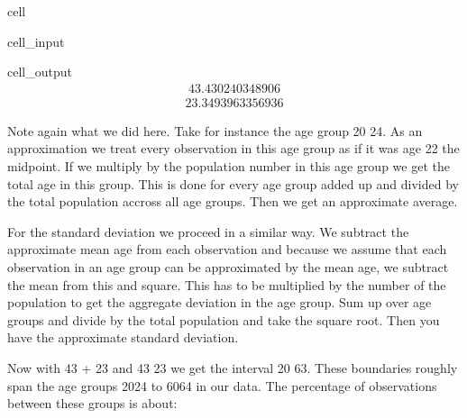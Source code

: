 \documentclass[letterpaper,10pt,english]{jupyterBook}
\begin{document}
\begin{sphinxuseclass}{cell}
\begin{sphinxVerbatimInput}
\begin{sphinxuseclass}{cell_input}
\begin{sphinxVerbatim}[commandchars=\\\{\}]
\end{sphinxVerbatim}

\end{sphinxuseclass}\end{sphinxVerbatimInput}
\begin{sphinxVerbatimOutput}

\begin{sphinxuseclass}{cell_output}\begin{equation*}
\begin{split}43.430240348906\end{split}
\end{equation*}\begin{equation*}
\begin{split}23.3493963356936\end{split}
\end{equation*}
\end{sphinxuseclass}\end{sphinxVerbatimOutput}

\end{sphinxuseclass}
\sphinxAtStartPar
Note again what we did here. Take for instance the age group 20 \sphinxhyphen{} 24. As an approximation we treat every observation in this age group as if it was age 22 \sphinxhyphen{} the midpoint. If we multiply by the population number in this age group we get the total age in this group. This is done for every age group added up and divided by the
total population accross all age groups. Then we get an approximate average.

\sphinxAtStartPar
For the standard deviation we proceed in a similar way. We subtract the approximate mean age from each observation and because we assume that each observation in an age group can be approximated by the mean age, we subtract the mean from this and square. This has to be multiplied by the number of the population to get the aggregate deviation in the age group. Sum up over age groups and divide by the total population and take the square root. Then you have the approximate standard deviation.

\sphinxAtStartPar
Now with 43 + 23 and 43 \sphinxhyphen{} 23 we get the interval 20 \sphinxhyphen{} 63. These boundaries roughly span the age groups 20\sphinxhyphen{}24 to 60\sphinxhyphen{}64 in our data. The percentage of observations between these groups is about:
\end{document}
